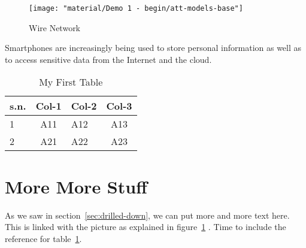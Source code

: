 \documentclass{article}
\begin{document}
\begin{figure}
	\centering
	\texttt{[image: "material/Demo 1 - begin/att-models-base"]}
	\caption{Wire Network}
	\label{fig:att-models-base}
\end{figure}
Smartphones are increasingly being used to store personal information as well as to access sensitive data from the Internet and the cloud. 

\begin{table}[h]
	\centering
	\begin{tabular}{l|cp{1in}c}  
		s.n.     &    Col-1    &    Col-2    &   Col-3  \\  \hline
		1         &     A11      &     A12     &    A13     \\
		2        &     A21      &    A22      &   A23    \\
	\end{tabular}
\caption{My First Table}
\label{tab:3-col-table}
\end{table}


\section{More More Stuff}
As we saw in section~\ref{sec:drilled-down}, we can put more and more text here. This is linked with the picture as explained in figure~\ref{fig:att-models-base} . Time to include the reference for table~\ref{tab:3-col-table}.




	
	
	
	
	
	
	
	
	
	
	
	
	
	
	
	
	
	
	
\end{document}
